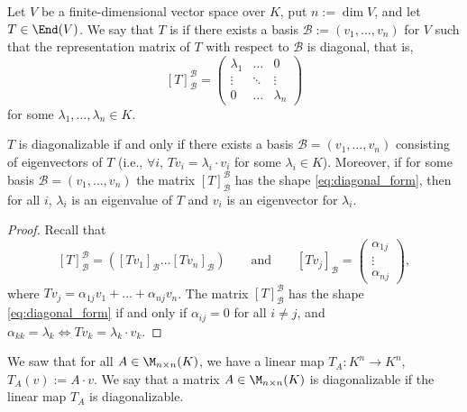 \begin{definition}\label{def:diagonalizable_endomorphism}
  Let $V$ be a finite-di\-men\-sional vector space over $K$, put $n := \dim V$, and let $T \in \End(V)$. We say that $T$ is  if there exists a basis $\mathcal{B} := (v_1, \dots, v_n)$ for $V$ such that the representation matrix of $T$ with respect to $\mathcal{B}$ is diagonal, that is,
  \begin{equation} \label{eq:diagonal_form}
    [T]_{\mathcal{B}}^{\mathcal{B}} = \begin{pmatrix} \lambda_1 & \dots & 0 \\ \vdots & \ddots & \vdots \\ 0 & \dots & \lambda_n \end{pmatrix}
  \end{equation}
  for some $\lambda_1, \dots, \lambda_n \in K$.
\end{definition}

\begin{lemma}\label{lem:diagonalizable_matrix_criterion}
  $T$ is diagonalizable if and only if there exists a basis $\mathcal{B}=(v_1, \dots, v_n)$ consisting of eigenvectors of $T$ (i.e., $\forall i$, $Tv_i = \lambda_i \cdot v_i$ for some $\lambda_i \in K$).
  Moreover, if for some basis $\mathcal{B}=(v_1, \dots, v_n)$ the matrix $[T]_{\mathcal{B}}^{\mathcal{B}}$ has the shape \eqref{eq:diagonal_form}, then for all $i$, $\lambda_i$ is an eigenvalue of $T$ and $v_i$ is an eigenvector for $\lambda_i$.
\end{lemma}

\begin{proof}
  Recall that
  \[
  [T]_{\mathcal{B}}^{\mathcal{B}} = \left( [Tv_1]_{\mathcal{B}} \dots [Tv_n]_{\mathcal{B}} \right) \qquad \text{and} \qquad [Tv_j]_{\mathcal{B}} = \begin{pmatrix} \alpha_{1j} \\ \vdots \\ \alpha_{nj} \end{pmatrix},
  \]
  where $Tv_j = \alpha_{1j}v_1 + \dots + \alpha_{nj}v_n$.
  The matrix $[T]_{\mathcal{B}}^{\mathcal{B}}$ has the shape \eqref{eq:diagonal_form} if and only if $\alpha_{ij} = 0$ for all $i \ne j$, and $\alpha_{kk} = \lambda_k \iff Tv_k = \lambda_k \cdot v_k$.
\end{proof}

\begin{remark}\label{rem:diagonalizable_matrix}
  We saw that for all $A \in \M_{n \times n}(K)$, we have a linear map $T_A: K^n \rightarrow K^n$, $T_A(v) := A \cdot v$. We say that a matrix $A \in \M_{n \times n}(K)$ is diagonalizable if the linear map $T_A$ is diagonalizable.
\end{remark}

